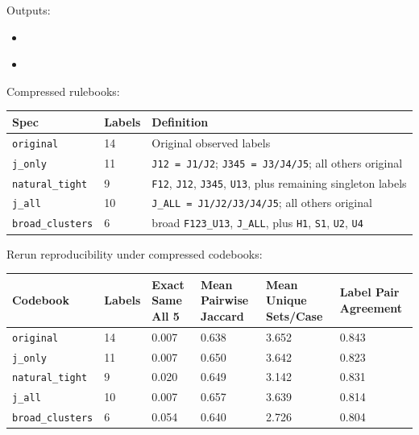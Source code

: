 \documentclass[11pt]{article}
\begin{document}
Outputs:

\begin{itemize}[leftmargin=1.5em]
  \item \href{../results/compressed_rulebook/compressed_rulebook_reproducibility_reruns.csv}{}
  \item \href{../results/compressed_rulebook/compressed_rulebook_alpha_seed_and_reruns_available.csv}{}
\end{itemize}

Compressed rulebooks:

\begin{longtable}{L{0.20\textwidth} R{0.10\textwidth} L{0.60\textwidth}}
\toprule
Spec & Labels & Definition \\
\midrule
\endhead
\texttt{original} & 14 & Original observed labels \\
\texttt{j\_only} & 11 & \texttt{J12 = J1/J2}; \texttt{J345 = J3/J4/J5}; all others original \\
\texttt{natural\_tight} & 9 & \texttt{F12}, \texttt{J12}, \texttt{J345}, \texttt{U13}, plus remaining singleton labels \\
\texttt{j\_all} & 10 & \texttt{J\_ALL = J1/J2/J3/J4/J5}; all others original \\
\texttt{broad\_clusters} & 6 & broad \texttt{F123\_U13}, \texttt{J\_ALL}, plus \texttt{H1}, \texttt{S1}, \texttt{U2}, \texttt{U4} \\
\bottomrule
\end{longtable}

Rerun reproducibility under compressed codebooks:

\begin{longtable}{L{0.22\textwidth} R{0.10\textwidth} R{0.13\textwidth} R{0.15\textwidth} R{0.15\textwidth} R{0.15\textwidth}}
\toprule
Codebook & Labels & Exact Same All 5 & Mean Pairwise Jaccard & Mean Unique Sets/Case & Label Pair Agreement \\
\midrule
\endhead
\texttt{original} & 14 & 0.007 & 0.638 & 3.652 & 0.843 \\
\texttt{j\_only} & 11 & 0.007 & 0.650 & 3.642 & 0.823 \\
\texttt{natural\_tight} & 9 & 0.020 & 0.649 & 3.142 & 0.831 \\
\texttt{j\_all} & 10 & 0.007 & 0.657 & 3.639 & 0.814 \\
\texttt{broad\_clusters} & 6 & 0.054 & 0.640 & 2.726 & 0.804 \\
\bottomrule
\end{longtable}
\end{document}

